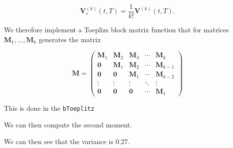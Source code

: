 \documentclass[a4paper,12pt,openany]{book}
\begin{document}
\[
\mathbf V_r^{(k)}(t,T)=\frac{1}{k!}\mathbf V^{(k)}(t,T).
\]

We therefore implement a Toeplizs block matrix function that for matrices \(\mathbf M_1,...,\mathbf M_k\) generates the matrix

\[
\mathbf M=\begin{pmatrix}
\mathbf M_1 & \mathbf M_2 & \mathbf M_3 &\cdots & \mathbf M_k\\
\mathbf 0 & \mathbf M_1 & \mathbf M_2 & \cdots & \mathbf M_{k-1}\\
\mathbf 0 & \mathbf 0 & \mathbf M_1 & \cdots & \mathbf M_{k-2}\\
\vdots & \vdots & \vdots & \ddots & \vdots\\
\mathbf 0 & \mathbf 0 & \mathbf 0 & \cdots & \mathbf M_1
\end{pmatrix}
\]

This is done in the \texttt{bToeplitz}

We can then compute the second moment.

We can then see that the variance is 0.27.

\newpage

\printindex

\newpage
\nocite{*}
{}

\begin{spacing}{1}

\end{spacing}

\newpage
{}
{}
\begin{spacing}{1}
\printindex
\end{spacing}
\end{document}
